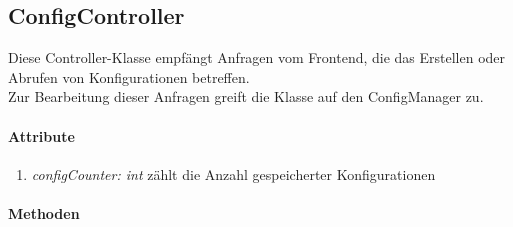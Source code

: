 \subsection*{ConfigController}\label{ConCon}
Diese Controller-Klasse empfängt Anfragen vom Frontend, die das Erstellen oder Abrufen von Konfigurationen betreffen. \\Zur Bearbeitung dieser Anfragen greift die Klasse auf den ConfigManager zu.


\paragraph{Attribute}
\begin{enumerate}[$\bullet$]
	\item \textit{configCounter: int} zählt die Anzahl gespeicherter Konfigurationen
\end{enumerate}

\paragraph{Methoden}

